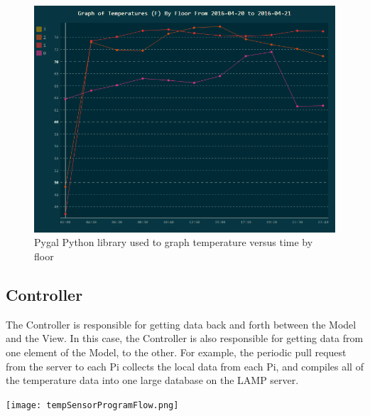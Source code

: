 \documentclass{article}
\begin{document}
				\begin{figure}[H]
					\begin{center}
						\includegraphics[scale=.58]{../graphs/GUI_B_by_floor.PNG}
					\end{center}
					\captionsetup{labelformat=empty}
					\caption{Pygal Python library used to graph temperature versus time by floor}
				\end{figure}
												
			
	\newpage		
			
		\subsection{Controller}
			The Controller is responsible for getting data back and forth between the Model and the View. In this case, the Controller
			is also responsible for getting data from one element of the Model, to the other. For example, the periodic pull request 
			from the server to each Pi collects the local data from each Pi, and compiles all of the temperature data into one large
			database on the LAMP server.
			
			\begin{center}
				\texttt{[image: tempSensorProgramFlow.png]}\\
			\end{center}
					
\end{document}
